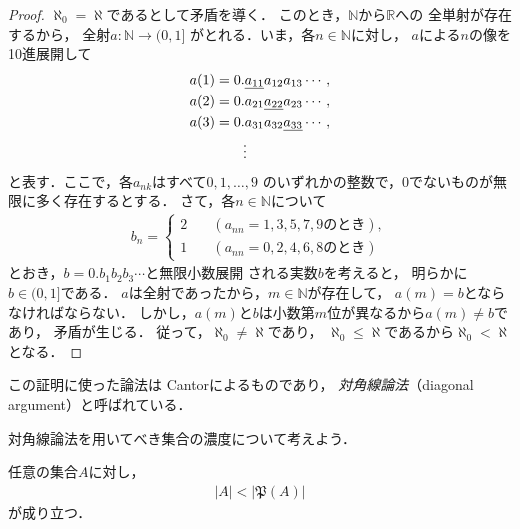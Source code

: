    \begin{proof}
     $\aleph _0 = \aleph$であるとして矛盾を導く．
     このとき，$\mathbb{N}$から$\mathbb{R}$への
     全単射が存在するから，
     全射$a: \mathbb{N} \longrightarrow (0,1]$
     がとれる．いま，各$n \in \mathbb{N}$に対し，
     $a$による$n$の像を
     10進展開して
     \begin{align*}
       a(1) & = 0. \underline{ a_{11} } a_{12} a_{13} \cdots , \\
       a(2) & = 0. a_{21} \underline{ a_{22} } a_{23} \cdots , \\
       a(3) & = 0. a_{31} a_{32} \underline{ a_{33} } \cdots , \\
            & \hspace{0.7cm} \vdots
     \end{align*}
     と表す．ここで，各$a_{nk}$はすべて$0, 1, \ldots , 9$
     のいずれかの整数で，0でないものが無限に多く存在するとする．
     さて，各$n \in \mathbb{N}$について
     \begin{align*}
       b_n = \left \{ 
         \begin{aligned}
           2 \quad & ( a_{nn} = 1,3,5,7,9 \text{のとき} ) , \\
           1 \quad & ( a_{nn} = 0,2,4,6,8 \text{のとき} )
         \end{aligned}
         \right.
     \end{align*}
     とおき，$b= 0.b_1 b_2 b_3 \cdots$と無限小数展開
     される実数$b$を考えると，
     明らかに$b \in ( 0,1]$である．
     $a$は全射であったから，$m \in \mathbb{N}$が存在して，
     $a(m) = b$とならなければならない．
     しかし，$a(m)$と$b$は小数第$m$位が異なるから$a(m) \neq b$であり，
     矛盾が生じる．
     従って，$\aleph _0 \neq \aleph$であり，
     $\aleph_0 \leq \aleph$であるから$\aleph _0 < \aleph$となる．
   \end{proof}
   
   この証明に使った論法は
   Cantorによるものであり，
   \emph{対角線論法}（diagonal argument）と呼ばれている．
   
   対角線論法を用いてべき集合の濃度について考えよう．

   \begin{thm}[Cantorの定理] \label{thm:bekinoudo}
     任意の集合$A$に対し，
     \begin{align}
       \lvert A \rvert < \left \lvert \mathfrak{P} (A) \right \rvert 
       \label{eq:bekinoudo}
     \end{align}
     が成り立つ．
   \end{thm}

